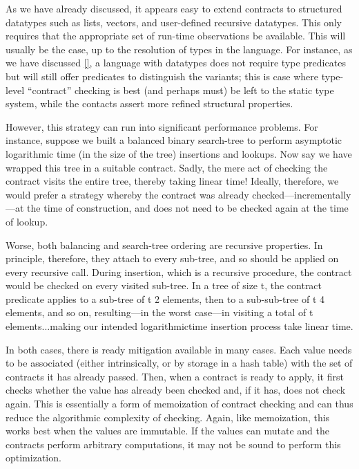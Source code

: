 
As we have already discussed, it appears easy to extend contracts to structured
datatypes such as lists, vectors, and user-defined recursive datatypes. This
only requires that the appropriate set of run-time observations be available.
This will usually be the case, up to the resolution of types in the language.
For instance, as we have discussed \ref{}, a language with datatypes does not
require type predicates but will still offer predicates to distinguish the
variants; this is case where type-level “contract” checking is best (and perhaps
must) be left to the static type system, while the contacts assert more refined
structural properties.

However, this strategy can run into significant performance problems. For
instance, suppose we built a balanced binary search-tree to perform asymptotic
logarithmic time (in the size of the tree) insertions and lookups. Now say we
have wrapped this tree in a suitable contract. Sadly, the mere act of checking
the contract visits the entire tree, thereby taking linear time! Ideally,
therefore, we would prefer a strategy whereby the contract was already
checked—incrementally—at the time of construction, and does not need to be
checked again at the time of lookup.

Worse, both balancing and search-tree ordering are recursive properties. In
principle, therefore, they attach to every sub-tree, and so should be applied on
every recursive call. During insertion, which is a recursive procedure, the
contract would be checked on every visited sub-tree. In a tree of size t, the
contract predicate applies to a sub-tree of t 2 elements, then to a sub-sub-tree
of t 4 elements, and so on, resulting—in the worst case—in visiting a total of t
elements...making our intended logarithmictime insertion process take linear
time.

In both cases, there is ready mitigation available in many cases. Each value
needs to be associated (either intrinsically, or by storage in a hash table)
with the set of contracts it has already passed. Then, when a contract is ready
to apply, it first checks whether the value has already been checked and, if it
has, does not check again. This is essentially a form of memoization of contract
checking and can thus reduce the algorithmic complexity of checking. Again, like
memoization, this works best when the values are immutable. If the values can
mutate and the contracts perform arbitrary computations, it may not be sound to
perform this optimization.

